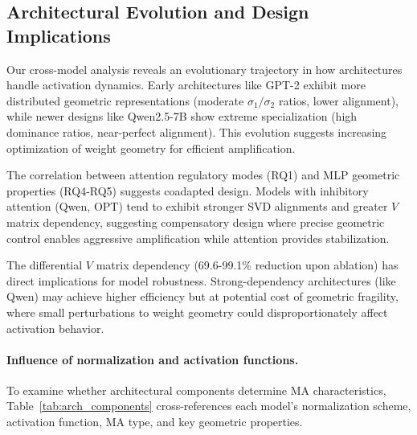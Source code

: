 \documentclass[conference]{IEEEtran}
\begin{document}
\subsection{Architectural Evolution and Design Implications}

Our cross-model analysis reveals an evolutionary trajectory in how architectures handle activation dynamics. Early architectures like GPT-2 exhibit more distributed geometric representations (moderate $\sigma_1/\sigma_2$ ratios, lower alignment), while newer designs like Qwen2.5-7B show extreme specialization (high dominance ratios, near-perfect alignment). This evolution suggests increasing optimization of weight geometry for efficient amplification.

The correlation between attention regulatory modes (RQ1) and MLP geometric properties (RQ4-RQ5) suggests coadapted design. Models with inhibitory attention (Qwen, OPT) tend to exhibit stronger SVD alignments and greater $V$ matrix dependency, suggesting compensatory design where precise geometric control enables aggressive amplification while attention provides stabilization.

The differential $V$ matrix dependency (69.6-99.1\% reduction upon ablation) has direct implications for model robustness. Strong-dependency architectures (like Qwen) may achieve higher efficiency but at potential cost of geometric fragility, where small perturbations to weight geometry could disproportionately affect activation behavior.

\paragraph{Influence of normalization and activation functions.}
To examine whether architectural components determine MA characteristics, Table~\ref{tab:arch_components} cross-references each model's normalization scheme, activation function, MA type, and key geometric properties.
\end{document}

